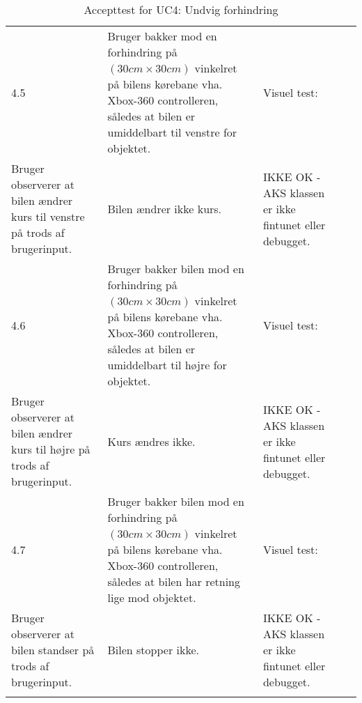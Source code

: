 \begin{longtable}{| l | >{\raggedright}X | >{\raggedright}X | >{\raggedright}X | >{\raggedright\arraybackslash}p{2.3cm} |}
	4.5 & Bruger bakker mod en forhindring på $(30cm \times 30cm)$ vinkelret på bilens kørebane vha. Xbox-360 controlleren, således at bilen er umiddelbart til venstre for objektet. 
		& Visuel test: \\ Bruger observerer at bilen ændrer kurs til venstre på trods af brugerinput. 
		& Bilen ændrer ikke kurs.
		& IKKE OK - AKS klassen er ikke fintunet eller debugget. \\ \hline
	
	4.6 & Bruger bakker bilen mod en forhindring på $(30cm \times 30cm)$ vinkelret på bilens kørebane vha. Xbox-360 controlleren, således at bilen er umiddelbart til højre for objektet. 
		& Visuel test: \\ Bruger observerer at bilen ændrer kurs til højre på trods af brugerinput. 
		& Kurs ændres ikke.
		& IKKE OK - AKS klassen er ikke fintunet eller debugget.\\ \hline
	
	4.7 & Bruger bakker bilen mod en forhindring på $(30cm \times 30cm)$ vinkelret på bilens kørebane vha. Xbox-360 controlleren, således at bilen har retning lige mod objektet. 
		& Visuel test: \\ Bruger observerer at bilen standser på trods af brugerinput. 
		& Bilen stopper ikke. 
		& IKKE OK - AKS klassen er ikke fintunet eller debugget.\\\hline

\caption{Accepttest for UC4: Undvig forhindring}\label{tbl:acceptuc4}
\end{longtable}